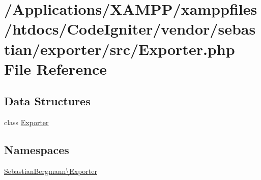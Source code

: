 \hypertarget{_exporter_8php}{}\section{/\+Applications/\+X\+A\+M\+P\+P/xamppfiles/htdocs/\+Code\+Igniter/vendor/sebastian/exporter/src/\+Exporter.php File Reference}
\label{_exporter_8php}
\subsection*{Data Structures}
\begin{DoxyCompactItemize}
\item 
class \mbox{\hyperlink{class_sebastian_bergmann_1_1_exporter_1_1_exporter}{Exporter}}
\end{DoxyCompactItemize}
\subsection*{Namespaces}
\begin{DoxyCompactItemize}
\item 
 \mbox{\hyperlink{namespace_sebastian_bergmann_1_1_exporter}{Sebastian\+Bergmann\textbackslash{}\+Exporter}}
\end{DoxyCompactItemize}
